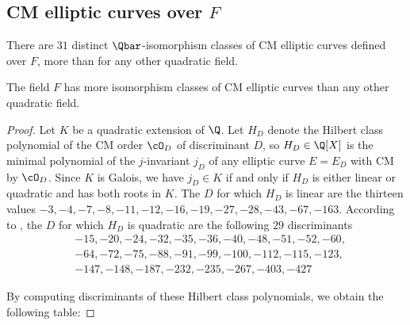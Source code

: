 \documentclass{amsart}
\begin{document}
\subsection{CM elliptic curves over $F$}\label{sec:cm}

There are $31$ distinct $\Qbar$-isomorphism classes of CM elliptic
curves defined over $F$, more than for any other
quadratic field.

\begin{proposition}
The field $F$ has more isomorphism classes of CM
elliptic curves than any other quadratic field.
\end{proposition}
\begin{proof}
Let $K$ be a quadratic extension of $\Q$.
Let $H_D$ denote the Hilbert class polynomial of the CM order
$\cO_D$ of discriminant $D$, so $H_D\in \Q[X]$ is the minimal
polynomial of the $j$-invariant $j_D$ of any elliptic curve $E=E_D$ with
CM by $\cO_D$.   Since $K$ is Galois, we have $j_D \in K$ if and only if
$H_D$ is either linear or quadratic and has both roots in $K$.
The $D$ for which $H_D$ is linear are the thirteen values
$-3, -4, -7, -8, -11, -12, -16, -19, -27, -28, -43, -67, -163$.
According to \cite{cremona:abvar}, the
$D$ for which $H_D$ is quadratic are the following $29$
discriminants
\begin{align*}
&-15, -20, -24, -32, -35, -36, -40, -48, -51, -52, -60, \\
&-64, -72, -75, -88, -91, -99, -100, -112, -115, -123, \\
&-147, -148, -187, -232, -235, -267, -403, -427
\end{align*}
 
By computing discriminants of these Hilbert class polynomials,
we obtain the following table:



\end{proof}
\end{document}
